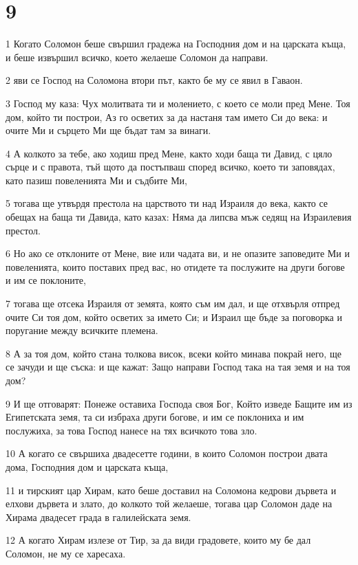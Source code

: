 \chapter{9}

\par 1 Когато Соломон беше свършил градежа на Господния дом и на царската къща, и беше извършил всичко, което желаеше Соломон да направи.
\par 2 яви се Господ на Соломона втори път, както бе му се явил в Гаваон.
\par 3 Господ му каза: Чух молитвата ти и молението, с което се моли пред Мене. Тоя дом, който ти построи, Аз го осветих за да настаня там името Си до века: и очите Ми и сърцето Ми ще бъдат там за винаги.
\par 4 А колкото за тебе, ако ходиш пред Мене, както ходи баща ти Давид, с цяло сърце и с правота, тъй щото да постъпваш според всичко, което ти заповядах, като пазиш повеленията Ми и съдбите Ми,
\par 5 тогава ще утвърдя престола на царството ти над Израиля до века, както се обещах на баща ти Давида, като казах: Няма да липсва мъж седящ на Израилевия престол.
\par 6 Но ако се отклоните от Мене, вие или чадата ви, и не опазите заповедите Ми и повеленията, които поставих пред вас, но отидете та послужите на други богове и им се поклоните,
\par 7 тогава ще отсека Израиля от земята, която съм им дал, и ще отхвърля отпред очите Си тоя дом, който осветих за името Си; и Израил ще бъде за поговорка и поругание между всичките племена.
\par 8 А за тоя дом, който стана толкова висок, всеки който минава покрай него, ще се зачуди и ще съска: и ще кажат: Защо направи Господ така на тая земя и на тоя дом?
\par 9 И ще отговарят: Понеже оставиха Господа своя Бог, Който изведе Бащите им из Египетската земя, та си избраха други богове, и им се поклониха и им послужиха, за това Господ нанесе на тях всичкото това зло.
\par 10 А когато се свършиха двадесетте години, в които Соломон построи двата дома, Господния дом и царската къща,
\par 11 и тирският цар Хирам, като беше доставил на Соломона кедрови дървета и елхови дървета и злато, до колкото той желаеше, тогава цар Соломон даде на Хирама двадесет града в галилейската земя.
\par 12 А когато Хирам излезе от Тир, за да види градовете, които му бе дал Соломон, не му се харесаха.
